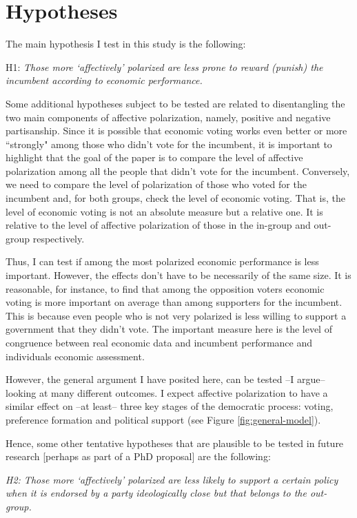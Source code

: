 \documentclass[a4paper, svgnames]{article}
\begin{document}
\section{Hypotheses}

The main hypothesis I test in this study is the following:

H1: \textit{Those more `affectively' polarized are less prone to reward (punish) the incumbent according to economic performance.}

Some additional hypotheses subject to be tested are related to disentangling the two main components of affective polarization, namely, positive and negative partisanship. Since it is possible that economic voting works even better or more ``strongly" among those who didn't vote for the incumbent, it is important to highlight that the goal of the paper is to compare the level of affective polarization among all the people that didn't vote for the incumbent. Conversely, we need to compare the level of polarization of those who voted for the incumbent and, for both groups, check the level of economic voting. That is, the level of economic voting is not an absolute measure but a relative one. It is relative to the level of affective polarization of those in the in-group and out-group respectively.

Thus, I can test if among the most polarized economic performance is less important. However, the effects don't have to be necessarily of the same size. It is reasonable, for instance, to find that among the opposition voters economic voting is more important on average than among supporters for the incumbent. This is because even people who is not very polarized is less willing to support a government that they didn't vote. The important measure here is the level of congruence between real economic data and incumbent performance and individuals economic assessment.

However, the general argument I have posited here, can be tested --I argue-- looking at many different outcomes. I expect affective polarization to have a similar effect on --at least-- three key stages of the democratic process: voting, preference formation and political support (see Figure \ref{fig:general-model}).

Hence, some other tentative hypotheses that are plausible to be tested in future research [perhaps as part of a PhD proposal] are the following:

\textit{H2: Those more `affectively' polarized are less likely to support a certain policy when it is endorsed by a party ideologically close but that belongs to the out-group.}
\end{document}
